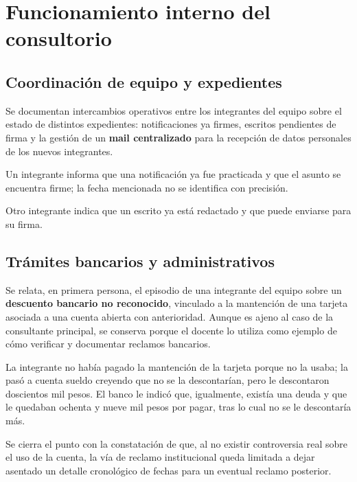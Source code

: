\documentclass[12pt,oneside]{book}
\begin{document}
\chapter[Funcionamiento interno]{Funcionamiento interno del consultorio}

\section{Coordinaci\'on de equipo y expedientes}

Se documentan intercambios operativos entre los integrantes del equipo sobre el estado de distintos expedientes: notificaciones ya firmes, escritos pendientes de firma y la gesti\'on de un \textbf{mail centralizado} para la recepci\'on de datos personales de los nuevos integrantes.

Un integrante informa que una notificaci\'on ya fue practicada y que el asunto se encuentra firme; la fecha mencionada no se identifica con precisi\'on.

Otro integrante indica que un escrito ya est\'a redactado y que puede enviarse para su firma.

\section{Tr\'amites bancarios y administrativos}

Se relata, en primera persona, el episodio de una integrante del equipo sobre un \textbf{descuento bancario no reconocido}, vinculado a la mantenci\'on de una tarjeta asociada a una cuenta abierta con anterioridad. Aunque es ajeno al caso de la consultante principal, se conserva porque el docente lo utiliza como ejemplo de c\'omo verificar y documentar reclamos bancarios.

La integrante no hab\'ia pagado la mantenci\'on de la tarjeta porque no la usaba; la pas\'o a cuenta sueldo creyendo que no se la descontar\'ian, pero le descontaron doscientos mil pesos. El banco le indic\'o que, igualmente, exist\'ia una deuda y que le quedaban ochenta y nueve mil pesos por pagar, tras lo cual no se le descontar\'ia m\'as.

Se cierra el punto con la constataci\'on de que, al no existir controversia real sobre el uso de la cuenta, la v\'ia de reclamo institucional queda limitada a dejar asentado un detalle cronol\'ogico de fechas para un eventual reclamo posterior.
\end{document}
